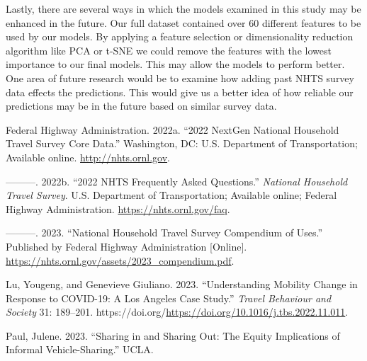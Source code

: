 \documentclass[
  article,
  nofooter]{jss}
\newlength{\cslhangindent}
\newenvironment{CSLReferences}[2] %
 {\begin{list}{}{%
  \setlength{\itemindent}{0pt}
  \setlength{\leftmargin}{0pt}
  \setlength{\parsep}{0pt}
  \ifodd #1
   \setlength{\leftmargin}{\cslhangindent}
   \setlength{\itemindent}{-1\cslhangindent}
  \fi
  \setlength{\itemsep}{#2\baselineskip}}}
 {\end{list}}
\begin{document}
Lastly, there are several ways in which the models examined in this
study may be enhanced in the future. Our full dataset contained over 60
different features to be used by our models. By applying a feature
selection or dimensionality reduction algorithm like PCA or t-SNE we
could remove the features with the lowest importance to our final
models. This may allow the models to perform better. One area of future
research would be to examine how adding past NHTS survey data effects
the predictions. This would give us a better idea of how reliable our
predictions may be in the future based on similar survey data.

\label{refs}
\begin{CSLReferences}{1}{0}
Federal Highway Administration. 2022a. {``{2022 NextGen National
Household Travel Survey Core Data}.''} Washington, DC: {U.S. Department
of Transportation}; Available online. \url{http://nhts.ornl.gov}.

---------. 2022b. {``{2022 NHTS Frequently Asked Questions}.''}
\emph{{National Household Travel Survey}}. {U.S. Department of
Transportation}; Available online; {Federal Highway Administration}.
\url{https://nhts.ornl.gov/faq}.

---------. 2023. {``National Household Travel Survey Compendium of
Uses.''} Published by Federal Highway Administration {[}Online{]}.
\url{https://nhts.ornl.gov/assets/2023_compendium.pdf}.

Lu, Yougeng, and Genevieve Giuliano. 2023. {``Understanding Mobility
Change in Response to COVID-19: A Los Angeles Case Study.''}
\emph{Travel Behaviour and Society} 31: 189--201.
https://doi.org/\url{https://doi.org/10.1016/j.tbs.2022.11.011}.

Paul, Julene. 2023. {``Sharing in and Sharing Out: The Equity
Implications of Informal Vehicle-Sharing.''} UCLA.

\end{CSLReferences}
\end{document}
